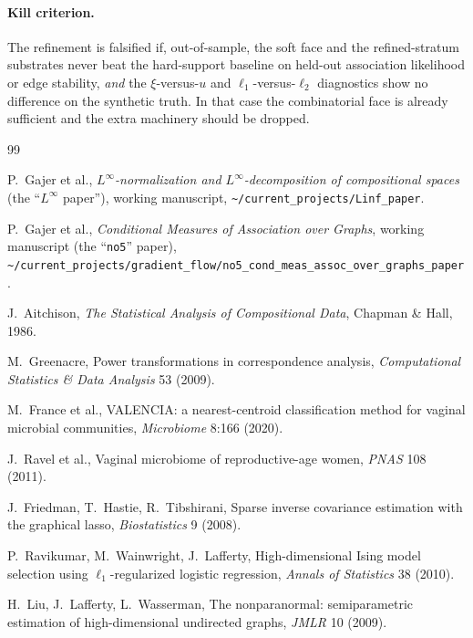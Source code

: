 \documentclass[11pt]{article}
\theoremstyle{definition}
\theoremstyle{plain}
\theoremstyle{remark}
\newcommand{\Linf}{L^{\infty}}
\newcommand{\1}{\mathbf{1}}
\begin{document}
\paragraph{Kill criterion.}
The refinement is falsified if, out-of-sample, the soft face and the
refined-stratum substrates never beat the hard-support baseline on held-out
association likelihood or edge stability, \emph{and} the $\xi$-versus-$u$ and
$\ell_1$-versus-$\ell_2$ diagnostics show no difference on the synthetic truth.
In that case the combinatorial face is already sufficient and the extra machinery
should be dropped.

\begin{thebibliography}{99}\small

 P.~Gajer et al.,
  \emph{$L^{\infty}$-normalization and $\Linf$-decomposition of compositional
  spaces} (the ``$\Linf$ paper''), working manuscript,
  \texttt{\~{}/current\_projects/Linf\_paper}.

 P.~Gajer et al.,
  \emph{Conditional Measures of Association over Graphs}, working manuscript
  (the ``\texttt{no5}'' paper),
  \texttt{\~{}/current\_projects/gradient\_flow/no5\_cond\_meas\_assoc\_over\_graphs\_paper}.

 J.~Aitchison,
  \emph{The Statistical Analysis of Compositional Data}, Chapman \& Hall, 1986.

 M.~Greenacre,
  Power transformations in correspondence analysis,
  \emph{Computational Statistics \& Data Analysis} 53 (2009).

 M.~France et al.,
  VALENCIA: a nearest-centroid classification method for vaginal microbial
  communities, \emph{Microbiome} 8:166 (2020).

 J.~Ravel et al.,
  Vaginal microbiome of reproductive-age women,
  \emph{PNAS} 108 (2011).

 J.~Friedman, T.~Hastie, R.~Tibshirani,
  Sparse inverse covariance estimation with the graphical lasso,
  \emph{Biostatistics} 9 (2008).

 P.~Ravikumar, M.~Wainwright, J.~Lafferty,
  High-dimensional Ising model selection using $\ell_1$-regularized logistic
  regression, \emph{Annals of Statistics} 38 (2010).

 H.~Liu, J.~Lafferty, L.~Wasserman,
  The nonparanormal: semiparametric estimation of high-dimensional undirected
  graphs, \emph{JMLR} 10 (2009).


\end{thebibliography}
\end{document}
